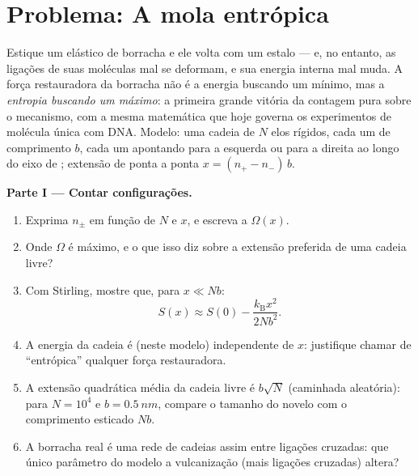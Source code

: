 \section{Problema: A mola entrópica}

\begin{problem}\label{pb:b3:microcanonical-ensemble:1}
Estique um elástico de borracha e ele volta com um estalo --- e, no
entanto, as ligações de suas moléculas mal se deformam, e sua energia
interna mal muda. A força restauradora da borracha não é a energia
buscando um mínimo, mas a \emph{entropia buscando um máximo}: a
primeira grande vitória da contagem pura sobre o mecanismo, com a mesma
matemática que hoje governa os experimentos de molécula única com DNA.
Modelo: uma cadeia de $N$ elos rígidos, cada um de comprimento $b$,
cada um apontando para a esquerda ou para a direita ao longo do eixo de
; extensão de ponta a ponta $x = (n_+ - n_-)\,b$.

\medskip\noindent\textbf{Parte I --- Contar configurações.}
\begin{enumerate}
  \item Exprima $n_\pm$ em função de $N$ e $x$, e escreva a
         $\Omega(x)$.
  \item Onde $\Omega$ é máximo, e o que isso diz sobre a extensão
        preferida de uma cadeia livre?
  \item Com Stirling, mostre que, para $x \ll Nb$:
        \[
        S(x) \approx S(0) - \frac{k_{\text{B}}x^2}{2Nb^2} .
        \]
  \item A energia da cadeia é (neste modelo) independente de $x$:
        justifique chamar de ``entrópica'' qualquer força
        restauradora.
  \item A extensão quadrática média da cadeia livre é $b\sqrt N$
        (caminhada aleatória): para $N = 10^4$ e $b = \qty{0.5}{nm}$,
        compare o tamanho do novelo com o comprimento esticado $Nb$.
  \item A borracha real é uma rede de cadeias assim entre ligações
        cruzadas: que único parâmetro do modelo a vulcanização (mais
        ligações cruzadas) altera?
\end{enumerate}


\end{problem}
